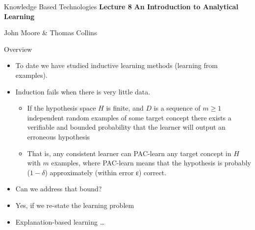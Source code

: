 \documentclass[%
pdf,
colorBG,
slideColor,
tcrico,
]{prosper}
\begin{document}



\begin{slide}{Knowledge Based Technologies}
	\textbf{Lecture 8} 
	\newline
	\textbf{An Introduction to Analytical Learning}

	\small
	John Moore \& Thomas Collins
\end{slide}


\begin{slide}{Overview}
\tiny
		\begin{itemize}
		\item To date we have studied inductive learning methods (learning from examples).
		\item Induction fails when there is very little data. 
			\begin{itemize}
			\item If the hypothesis space $H$ is finite, and $D$ is a sequence of $m \geq 1$ independent random examples of some target concept there exists a verifiable and bounded probability that the learner will output an erroneous hypothesis
    			\item That is, any consistent learner can PAC-learn any target concept in $H$ with $m$ examples, where PAC-learn means that the hypothesis is probably ($1 - \delta$) approximately (within error ε) correct.
			\end{itemize}
		\item Can we address that bound?
    		\item Yes, if we re-state the learning problem
		\item Explanation-based learning \dots
		\end{itemize}
\end{slide}

\end{document}
